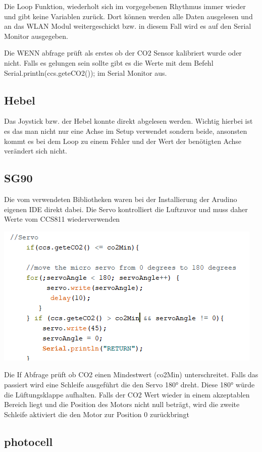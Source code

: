 Die Loop Funktion, wiederholt sich im vorgegebenen Rhythmus immer wieder und gibt keine Variablen zurück. Dort können werden alle Daten ausgelesen und an das WLAN Modul weitergeschickt bzw. in diesem Fall wird es auf den Serial Monitor ausgegeben.

Die WENN abfrage prüft als erstes ob der CO2 Sensor kalibriert wurde oder nicht. Falls es gelungen sein sollte gibt es die Werte mit dem Befehl Serial.println(ccs.geteCO2()); im Serial Monitor aus.

\subsection{Hebel}

Das Joystick bzw. der Hebel konnte direkt abgelesen werden. Wichtig hierbei ist es das man nicht nur eine Achse im Setup verwendet sondern beide, ansonsten kommt es bei dem Loop zu einem Fehler und der Wert der benötigten Achse verändert sich nicht.


\subsection{SG90}

Die vom verwendeten Bibliotheken waren bei der Installierung der Arudino eigenen IDE direkt dabei. Die Servo kontrolliert die Luftzuvor und muss daher Werte vom CCS811 wiederverwenden

\includegraphics[width=1\linewidth]{../Bilder/Programmierung/loop(SG)}

Die If Abfrage prüft ob CO2 einen Mindestwert (co2Min) unterschreitet. Falls das passiert  wird eine Schleife ausgeführt die den Servo 180° dreht. Diese 180° würde die Lüftungsklappe aufhalten. Falls der CO2 Wert wieder in einem akzeptablen Bereich liegt und die Position des Motors nicht null beträgt, wird die zweite Schleife aktiviert die den Motor zur Position 0 zurückbringt 


\subsection{photocell}


